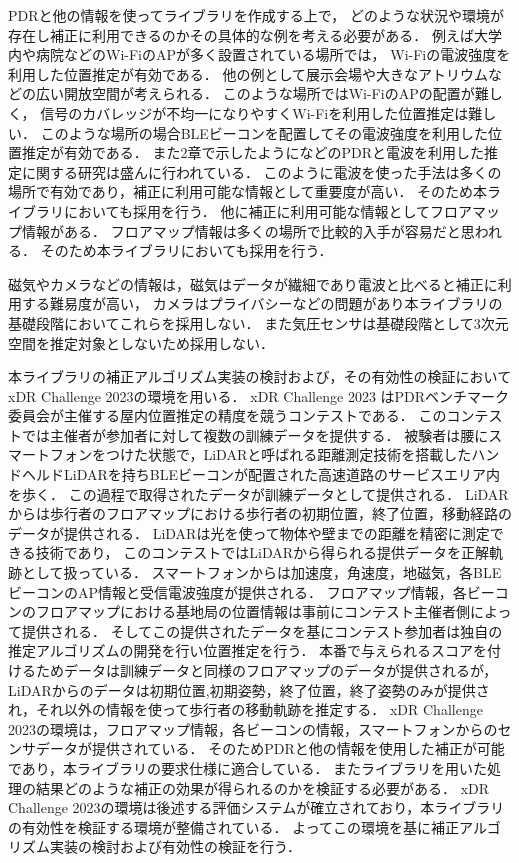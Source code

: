 

PDRと他の情報を使ってライブラリを作成する上で，
どのような状況や環境が存在し補正に利用できるのかその具体的な例を考える必要がある．
例えば大学内や病院などのWi-FiのAPが多く設置されている場所では，
Wi-Fiの電波強度を利用した位置推定が有効である．
他の例として展示会場や大きなアトリウムなどの広い開放空間が考えられる．
このような場所ではWi-FiのAPの配置が難しく，
信号のカバレッジが不均一になりやすくWi-Fiを利用した位置推定は難しい．
このような場所の場合BLEビーコンを配置してその電波強度を利用した位置推定が有効である．
また2章で示したように\cite{pdr-wifi}\cite{pdr-ble}などのPDRと電波を利用した推定に関する研究は盛んに行われている．
このように電波を使った手法は多くの場所で有効であり，補正に利用可能な情報として重要度が高い．
そのため本ライブラリにおいても採用を行う．
他に補正に利用可能な情報としてフロアマップ情報がある．
フロアマップ情報は多くの場所で比較的入手が容易だと思われる．
そのため本ライブラリにおいても採用を行う．

磁気やカメラなどの情報は，磁気はデータが繊細であり電波と比べると補正に利用する難易度が高い，
カメラはプライバシーなどの問題があり本ライブラリの基礎段階においてこれらを採用しない．
また気圧センサは基礎段階として3次元空間を推定対象としないため採用しない．

本ライブラリの補正アルゴリズム実装の検討および，その有効性の検証においてxDR Challenge 2023\cite{xdr}の環境を用いる．
xDR Challenge 2023 はPDRベンチマーク委員会が主催する屋内位置推定の精度を競うコンテストである．
このコンテストでは主催者が参加者に対して複数の訓練データを提供する．
被験者は腰にスマートフォンをつけた状態で，LiDARと呼ばれる距離測定技術を搭載したハンドヘルドLiDARを持ちBLEビーコンが配置された高速道路のサービスエリア内を歩く．
この過程で取得されたデータが訓練データとして提供される．
LiDARからは歩行者のフロアマップにおける歩行者の初期位置，終了位置，移動経路のデータが提供される．
LiDARは光を使って物体や壁までの距離を精密に測定できる技術であり，
このコンテストではLiDARから得られる提供データを正解軌跡として扱っている．
スマートフォンからは加速度，角速度，地磁気，各BLEビーコンのAP情報と受信電波強度が提供される．
フロアマップ情報，各ビーコンのフロアマップにおける基地局の位置情報は事前にコンテスト主催者側によって提供される．
そしてこの提供されたデータを基にコンテスト参加者は独自の推定アルゴリズムの開発を行い位置推定を行う．
本番で与えられるスコアを付けるためデータは訓練データと同様のフロアマップのデータが提供されるが，
LiDARからのデータは初期位置,初期姿勢，終了位置，終了姿勢のみが提供され，それ以外の情報を使って歩行者の移動軌跡を推定する．
xDR Challenge 2023の環境は，フロアマップ情報，各ビーコンの情報，スマートフォンからのセンサデータが提供されている．
そのためPDRと他の情報を使用した補正が可能であり，本ライブラリの要求仕様に適合している．
またライブラリを用いた処理の結果どのような補正の効果が得られるのかを検証する必要がある．
xDR Challenge 2023の環境は後述する評価システムが確立されており，本ライブラリの有効性を検証する環境が整備されている．
よってこの環境を基に補正アルゴリズム実装の検討および有効性の検証を行う．



